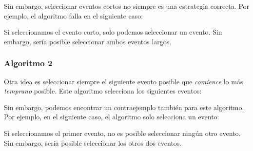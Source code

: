 Sin embargo, seleccionar eventos cortos no siempre
es una estrategia correcta. Por ejemplo, el algoritmo falla
en el siguiente caso:
\begin{center}
\end{center}
Si seleccionamos el evento corto, solo podemos seleccionar un evento.
Sin embargo, sería posible seleccionar ambos eventos largos.

\subsubsection*{Algoritmo 2}

Otra idea es seleccionar siempre el siguiente evento posible
que \emph{comience} lo más \emph{temprano} posible.
Este algoritmo selecciona los siguientes eventos:
\begin{center}
\end{center}

Sin embargo, podemos encontrar un contraejemplo
también para este algoritmo.
Por ejemplo, en el siguiente caso,
el algoritmo solo selecciona un evento:
\begin{center}
\end{center}
Si seleccionamos el primer evento, no es posible
seleccionar ningún otro evento.
Sin embargo, sería posible seleccionar los
otros dos eventos.

